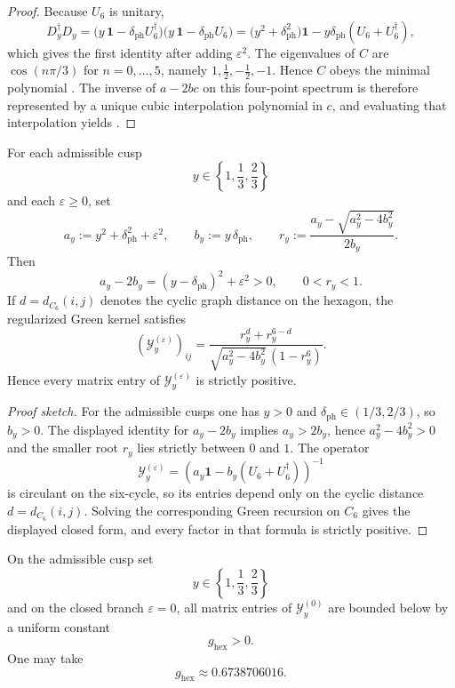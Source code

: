 \begin{proof}
Because $U_6$ is unitary,
\[
D_y^\dagger D_y
=
\bigl(y\,\mathbf 1-\delta_{\mathrm{ph}}U_6^\dagger\bigr)
\bigl(y\,\mathbf 1-\delta_{\mathrm{ph}}U_6\bigr)
=
\bigl(y^2+\delta_{\mathrm{ph}}^2\bigr)\mathbf 1
-y\delta_{\mathrm{ph}}(U_6+U_6^\dagger),
\]
which gives the first identity after adding $\varepsilon^2$. The eigenvalues of $C$ are $\cos(n\pi/3)$ for $n=0,\dots,5$, namely $1,\frac12,-\frac12,-1$. Hence $C$ obeys the minimal polynomial . The inverse of $a-2bc$ on this four-point spectrum is therefore represented by a unique cubic interpolation polynomial in $c$, and evaluating that interpolation yields .
\end{proof}

\begin{proposition}
\label{prop:strict-positive-c6-green}
For each admissible cusp
\[
y\in\left\{1,\frac13,\frac23\right\}
\]
and each $\varepsilon\ge 0$, set
\[
a_y:=y^2+\delta_{\mathrm{ph}}^2+\varepsilon^2,
\qquad
b_y:=y\,\delta_{\mathrm{ph}},
\qquad
r_y:=\frac{a_y-\sqrt{a_y^2-4b_y^2}}{2b_y}.
\]
Then
\[
a_y-2b_y=(y-\delta_{\mathrm{ph}})^2+\varepsilon^2>0,
\qquad
0<r_y<1.
\]
If $d=d_{C_6}(i,j)$ denotes the cyclic graph distance on the hexagon, the regularized Green
kernel satisfies
\[
(\mathcal Y_y^{(\varepsilon)})_{ij}
=
\frac{r_y^{d}+r_y^{6-d}}
{\sqrt{a_y^2-4b_y^2}\,(1-r_y^6)}.
\]
Hence every matrix entry of $\mathcal Y_y^{(\varepsilon)}$ is strictly positive.
\end{proposition}

\begin{proof}[Proof sketch]
For the admissible cusps one has $y>0$ and $\delta_{\mathrm{ph}}\in(1/3,2/3)$, so $b_y>0$. The
displayed identity for $a_y-2b_y$ implies $a_y>2b_y$, hence $a_y^2-4b_y^2>0$ and the smaller
root $r_y$ lies strictly between $0$ and $1$. The operator
\[
\mathcal Y_y^{(\varepsilon)}=(a_y\mathbf 1-b_y(U_6+U_6^\dagger))^{-1}
\]
is circulant on the six-cycle, so its entries depend only on the cyclic distance
$d=d_{C_6}(i,j)$. Solving the corresponding Green recursion on $C_6$ gives the displayed closed
form, and every factor in that formula is strictly positive.
\end{proof}

\begin{corollary}
\label{cor:uniform-positive-c6-green}
On the admissible cusp set
\[
y\in\left\{1,\frac13,\frac23\right\}
\]
and on the closed branch $\varepsilon=0$, all matrix entries of $\mathcal Y_y^{(0)}$ are bounded
below by a uniform constant
\[
g_{\mathrm{hex}}>0.
\]
One may take
\[
g_{\mathrm{hex}}\approx \num{0.6738706016}.
\]
\end{corollary}

